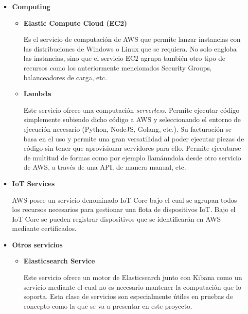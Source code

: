 \documentclass[../../memoria.tex]{subfiles}
\begin{document}
\begin{itemize}
      \item \textbf{Computing}
            \begin{itemize}
                  \item \textbf{Elastic Compute Cloud (EC2)}
                        \par
                        Es el servicio de computación de AWS que permite lanzar instancias con las distribuciones de Windows o Linux que se requiera. No solo engloba las instancias, sino que el servicio EC2 agrupa también otro tipo de recursos como los anteriormente mencionados Security Groups, balanceadores de carga, etc.
                  \item \textbf{Lambda}
                        \par
                        Este servicio ofrece una computación \textit{serverless}. Permite ejecutar código simplemente subiendo dicho código a AWS y seleccionando el entorno de ejecución necesario (Python, NodeJS, Golang, etc.). Su facturación se basa en el uso y permite una gran versatilidad al poder ejecutar piezas de código sin tener que aprovisionar servidores para ello. Permite ejecutarse de multitud de formas como por ejemplo llamánndola desde otro servicio de AWS, a través de una API, de manera manual, etc.
            \end{itemize}

      \item \textbf{IoT Services}
            \par
            AWS posee un servicio denominado IoT Core bajo el cual se agrupan todos los recursos necesarios para gestionar una flota de dispositivos IoT. Bajo el IoT Core se pueden registrar dispositivos que se identificarán en AWS mediante certificados.

      \item \textbf{Otros servicios}
            \begin{itemize}
                  \item \textbf{Elasticsearch Service}
                        \par
                        Este servicio ofrece un motor de Elasticsearch junto con Kibana como un servicio mediante el cual no es necesario mantener la computación que lo soporta. Esta clase de servicios son especialmente útiles en pruebas de concepto como la que se va a presentar en este proyecto.
            \end{itemize}
\end{itemize}
\end{document}
